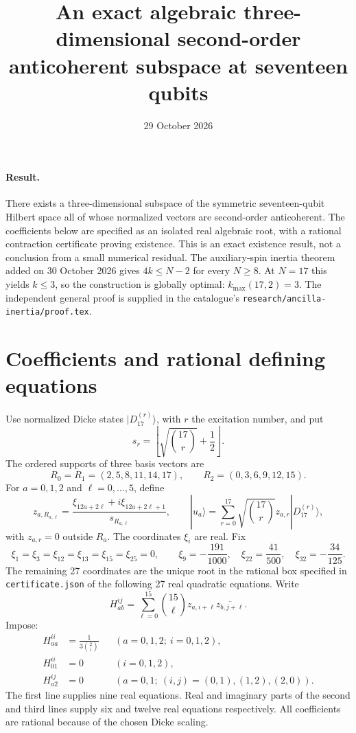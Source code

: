 \documentclass[11pt]{article}
\title{An exact algebraic three-dimensional second-order anticoherent subspace at seventeen qubits}
\date{29 October 2026}
\begin{document}
\maketitle
\paragraph{Result.} There exists a three-dimensional subspace of the symmetric
seventeen-qubit Hilbert space all of whose normalized vectors are second-order
anticoherent. The coefficients below are specified as an isolated real algebraic
root, with a rational contraction certificate proving existence. This is an exact
existence result, not a conclusion from a small numerical residual. The
auxiliary-spin inertia theorem added on 30 October 2026 gives $4k\le N-2$
for every $N\ge8$. At $N=17$ this yields $k\le3$, so the construction is
globally optimal: $k_{\max}(17,2)=3$. The independent general proof is supplied
in the catalogue's \texttt{research/ancilla-inertia/proof.tex}.

\section{Coefficients and rational defining equations}
Use normalized Dicke states $|D_{17}^{(r)}\rangle$, with $r$ the excitation number,
and put
\[
 s_r=\left\lfloor\sqrt{\binom{17}{r}}+\frac12\right\rfloor.
\]
The ordered supports of three basis vectors are
\[
 R_0=R_1=(2,5,8,11,14,17),\qquad R_2=(0,3,6,9,12,15).
\]
For $a=0,1,2$ and $\ell=0,\ldots,5$, define
\[
 z_{a,R_{a,\ell}}=
 \frac{\xi_{12a+2\ell}+i\xi_{12a+2\ell+1}}{s_{R_{a,\ell}}},
 \qquad
 |u_a\rangle=\sum_{r=0}^{17}\sqrt{\binom{17}{r}}z_{a,r}|D_{17}^{(r)}\rangle,
\]
with $z_{a,r}=0$ outside $R_a$. The coordinates $\xi_i$ are real. Fix
\[
 \xi_1=\xi_3=\xi_{12}=\xi_{13}=\xi_{15}=\xi_{25}=0,
 \qquad
 \xi_9=-\frac{191}{1000},\quad
 \xi_{22}=\frac{41}{500},\quad
 \xi_{32}=-\frac{34}{125}.
\]
The remaining 27 coordinates are the unique root in the rational box specified
in \texttt{certificate.json} of the following 27 real quadratic equations.
Write
\[
 H_{ab}^{ij}=\sum_{\ell=0}^{15}\binom{15}{\ell}
 z_{a,i+\ell}\overline{z_{b,j+\ell}}.
\]
Impose:
\begin{align*}
 H_{aa}^{ii}&=\frac{1}{3\binom2i}
 &&(a=0,1,2;\ i=0,1,2),\\
 H_{01}^{ii}&=0 &&(i=0,1,2),\\
 H_{a2}^{ij}&=0
 &&(a=0,1;\ (i,j)=(0,1),(1,2),(2,0)).
\end{align*}
The first line supplies nine real equations. Real and imaginary parts of the
second and third lines supply six and twelve real equations respectively. All
coefficients are rational because of the chosen Dicke scaling.
\end{document}

